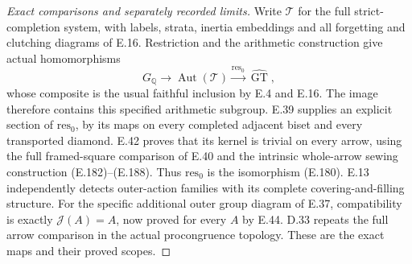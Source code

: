 \begin{proof}[Exact comparisons and separately recorded limits]
Write $\mathcal T$ for the full strict-completion system,
with labels, strata, inertia embeddings
and all forgetting and clutching diagrams of E.16.
Restriction and the arithmetic construction give actual
homomorphisms
\[
 G_{\mathbb Q}\longrightarrow\operatorname{Aut}(\mathcal T)
       \xrightarrow{\mathrm{res}_0}\widehat{\operatorname{GT}},
                                                               \tag{E.52}
\]
whose composite is the usual faithful inclusion by E.4
and E.16.  The image therefore contains this specified
arithmetic subgroup. E.39 supplies an explicit section of
$\mathrm{res}_0$, by its maps on every completed adjacent
biset and every transported diamond. E.42 proves that its
kernel is trivial on every arrow, using the full framed-square
comparison of E.40 and the intrinsic whole-arrow sewing
construction (E.182)--(E.188). Thus $\mathrm{res}_0$ is the
isomorphism (E.180). E.13 independently detects outer-action
families with its complete covering-and-filling structure.
For the specific additional outer group diagram of E.37,
compatibility is exactly $\mathcal J(A)=A$, now proved
for every $A$ by E.44. D.33 repeats the full arrow
comparison in the actual procongruence topology.
These are the exact maps and their proved scopes.


\end{proof}
